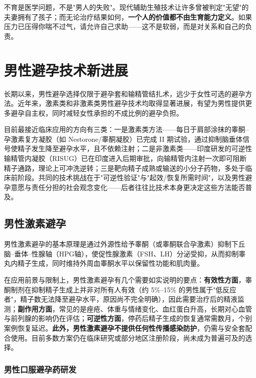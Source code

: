 \begin{tcolorbox}[colback=pink!5!white,colframe=red!50!black,title=贴心小叮咛]
不育是医学问题，不是"男人的失败"。现代辅助生殖技术让许多曾被判定"无望"的夫妻拥有了孩子；而无论治疗结果如何，\textbf{一个人的价值都不由生育能力定义}。如果压力已压得你喘不过气，请允许自己求助——这不是软弱，而是对关系和自己的负责。
\end{tcolorbox}


\section{男性避孕技术新进展}

长期以来，男性避孕选择仅限于避孕套和输精管结扎术，远少于女性可选的避孕方法。近年来，激素类和非激素类男性避孕技术均取得显著进展，有望为男性提供更多避孕自主权，同时减轻女性承担的不成比例的避孕负担。


目前最接近临床应用的方向有三类：一是激素类方法——每日于肩部涂抹的睾酮--孕激素复方凝胶（如 Nestorone/睾酮凝胶）已完成 II 期试验，通过抑制脑垂体信号使精子发生降至避孕水平，且不依赖注射；二是非激素类——印度研发的可逆性输精管内凝胶（RISUG）已在印度进入后期审批，向输精管内注射一次即可阻断精子通路，理论上可冲洗逆转；三是靶向精子成熟或输送的小分子药物，多处于临床前阶段。共同的技术挑战在于"可逆性验证"与"起效/恢复所需时间"，以及男性避孕意愿与责任分担的社会观念变化——后者往往比技术本身更决定这些方法能否普及。

\subsection{男性激素避孕}

男性激素避孕的基本原理是通过外源性给予睾酮（或睾酮联合孕激素）抑制下丘脑--垂体--性腺轴（HPG轴），使促性腺激素（FSH、LH）分泌受抑，从而抑制睾丸内精子生成，同时维持外周血睾酮水平以保留性功能和肌肉量。


在应用前景与限制上，男性激素避孕有几个需要如实说明的要点：\textbf{有效性方面}，睾酮制剂在抑制精子生成上并非对所有人有效（约 5\%--15\% 的男性属于"低反应者"，精子数无法降至避孕水平，原因尚不完全明确），因此需要治疗后的精液监测；\textbf{副作用方面}，常见的是痤疮、体重与情绪变化、血红蛋白升高，长期对心血管与前列腺的影响仍在评估；\textbf{可逆性方面}，停药后精子生成的恢复通常需数月，个别案例恢复延迟。\textbf{此外，男性激素避孕不提供任何性传播感染防护}，仍需与安全套配合使用。目前多数方案仍在临床研究或部分地区注册阶段，尚未成为普遍可及的选择。

\subsubsection{男性口服避孕药研发}

